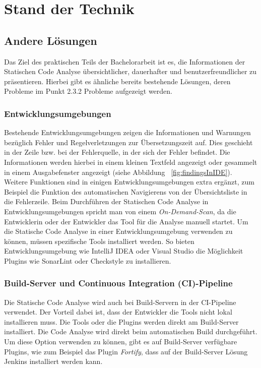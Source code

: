
\chapter{Stand der Technik}
\section{Andere Lösungen}
Das Ziel des praktischen Teils der Bachelorarbeit ist es, die Informationen der Statischen Code Analyse übersichtlicher, dauerhafter und benutzerfreundlicher zu präsentieren. Hierbei gibt es ähnliche bereits bestehende Lösungen, deren Probleme im Punkt 2.3.2 Probleme aufgezeigt werden.

\subsection{Entwicklungsumgebungen}
Bestehende Entwicklungsumgebungen zeigen die Informationen und Warnungen bezüglich Fehler und Regelverletzungen zur Übersetzungszeit auf. Dies geschieht in der Zeile bzw. bei der Fehlerquelle, in der sich der Fehler befindet. Die Informationen werden hierbei in einem kleinen Textfeld angezeigt oder gesammelt in einem Ausgabefenster angezeigt (siehe Abbildung ~\ref{fig:findingsInIDE}). Weitere Funktionen sind in einigen Entwicklungsumgebungen extra ergänzt, zum Beispiel die Funktion des automatischen Navigierens von der Übersichtsliste in die Fehlerzeile. Beim Durchführen der Statischen Code Analyse in Entwicklungsumgebungen spricht man von einem \textit{On-Demand-Scan}, da die Entwicklerin oder der Entwickler das Tool für die Analyse manuell startet. Um die Statische Code Analyse in einer Entwicklungsumgebung verwenden zu können, müssen spezifische Tools installiert werden. So bieten Entwicklungsumgebung wie IntelliJ IDEA oder Visual Studio die Möglichkeit Plugins wie SonarLint oder Checkstyle zu installieren. ~\parencite{sonarLint}
\subsection{Build-Server und Continuous Integration (CI)-Pipeline}
Die Statische Code Analyse wird auch bei Build-Servern in der CI-Pipeline verwendet. \parencite{zampetti2017open} Der Vorteil dabei ist, dass der Entwickler die Tools nicht lokal installieren muss. Die Tools oder die Plugins werden direkt am Build-Server installiert. Die Code Analyse wird direkt beim automatischen Build durchgeführt. Um diese Option verwenden zu können, gibt es auf Build-Server verfügbare Plugins, wie zum Beispiel das Plugin \textit{Fortify}, dass auf der Build-Server Lösung Jenkins installiert werden kann.
